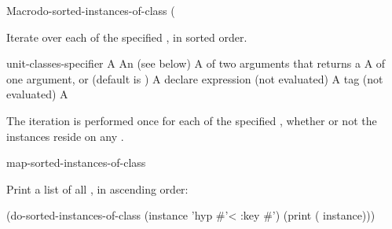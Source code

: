 \documentclass[10pt,twoside,english,pdftex]{article}
\begin{document}

\begin{functiondoc}{Macro}{do-sorted-instances-of-class}%
  {( 
    }
%
%

\fnsyntax

\fnpurpose Iterate over each  of the specified
, in sorted order.

\fnpackage {}

\fnmodule {}

\fnargs
\begin{args}{unit-classes-specifier}
\arg[var] A 
 An 
(see below)
\arg[predicate] A  of two arguments that returns a
\arg[key] A  of one argument, or \nil{} (default is \nil)
\arg[declaration] A declare expression (not evaluated)
\arg[tag] A  tag (not evaluated)
\arg[form] A 
\end{args}

\fndsyntax
\W\supp\tabletop
\unitclassesspec
\subclassingspec

\fndescription The iteration is performed once for each 
of the specified , whether or not the instances reside on
any .

\begin{alsos}{map-sorted-instances-of-class}
\end{alsos}

\fnexample
Print a list of all  , in ascending order:
%
\W\supp
\begin{example}
  (do-sorted-instances-of-class (instance 'hyp #'< :key #')
     (print ( instance)))
\end{example} 

\end{functiondoc}
\end{document}
